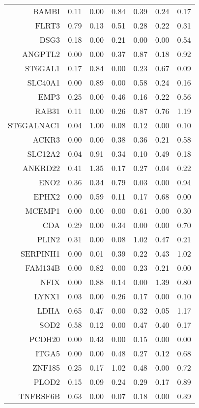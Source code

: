 \begin{longtable}{rrrrrrr}
  BAMBI & 0.11 & 0.00 & 0.84 & 0.39 & 0.24 & 0.17 \\ 
  FLRT3 & 0.79 & 0.13 & 0.51 & 0.28 & 0.22 & 0.31 \\ 
  DSG3 & 0.18 & 0.00 & 0.21 & 0.00 & 0.00 & 0.54 \\ 
  ANGPTL2 & 0.00 & 0.00 & 0.37 & 0.87 & 0.18 & 0.92 \\ 
  ST6GAL1 & 0.17 & 0.84 & 0.00 & 0.23 & 0.67 & 0.09 \\ 
  SLC40A1 & 0.00 & 0.89 & 0.00 & 0.58 & 0.24 & 0.16 \\ 
  EMP3 & 0.25 & 0.00 & 0.46 & 0.16 & 0.22 & 0.56 \\ 
  RAB31 & 0.11 & 0.00 & 0.26 & 0.87 & 0.76 & 1.19 \\ 
  ST6GALNAC1 & 0.04 & 1.00 & 0.08 & 0.12 & 0.00 & 0.10 \\ 
  ACKR3 & 0.00 & 0.00 & 0.38 & 0.36 & 0.21 & 0.58 \\ 
  SLC12A2 & 0.04 & 0.91 & 0.34 & 0.10 & 0.49 & 0.18 \\ 
  ANKRD22 & 0.41 & 1.35 & 0.17 & 0.27 & 0.04 & 0.22 \\ 
  ENO2 & 0.36 & 0.34 & 0.79 & 0.03 & 0.00 & 0.94 \\ 
  EPHX2 & 0.00 & 0.59 & 0.11 & 0.17 & 0.68 & 0.00 \\ 
  MCEMP1 & 0.00 & 0.00 & 0.00 & 0.61 & 0.00 & 0.30 \\ 
  CDA & 0.29 & 0.00 & 0.34 & 0.00 & 0.00 & 0.70 \\ 
  PLIN2 & 0.31 & 0.00 & 0.08 & 1.02 & 0.47 & 0.21 \\ 
  SERPINH1 & 0.00 & 0.01 & 0.39 & 0.22 & 0.43 & 1.02 \\ 
  FAM134B & 0.00 & 0.82 & 0.00 & 0.23 & 0.21 & 0.00 \\ 
  NFIX & 0.00 & 0.88 & 0.14 & 0.00 & 1.39 & 0.80 \\ 
  LYNX1 & 0.03 & 0.00 & 0.26 & 0.17 & 0.00 & 0.10 \\ 
  LDHA & 0.65 & 0.47 & 0.00 & 0.32 & 0.05 & 1.17 \\ 
  SOD2 & 0.58 & 0.12 & 0.00 & 0.47 & 0.40 & 0.17 \\ 
  PCDH20 & 0.00 & 0.43 & 0.00 & 0.15 & 0.00 & 0.00 \\ 
  ITGA5 & 0.00 & 0.00 & 0.48 & 0.27 & 0.12 & 0.68 \\ 
  ZNF185 & 0.25 & 0.17 & 1.02 & 0.48 & 0.00 & 0.72 \\ 
  PLOD2 & 0.15 & 0.09 & 0.24 & 0.29 & 0.17 & 0.89 \\ 
  TNFRSF6B & 0.63 & 0.00 & 0.07 & 0.18 & 0.00 & 0.39 \\ 

\end{longtable}
